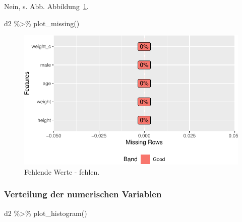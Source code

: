 \documentclass[
  a4paper,
  DIV=11]{scrreprt}
\newenvironment{Shaded}{\begin{snugshade}}{\end{snugshade}}
\newcommand{\FunctionTok}[1]{\textcolor[rgb]{0.28,0.35,0.67}{#1}}
\newcommand{\NormalTok}[1]{\textcolor[rgb]{0.00,0.23,0.31}{#1}}
\newcommand{\SpecialCharTok}[1]{\textcolor[rgb]{0.37,0.37,0.37}{#1}}
\theoremstyle{definition}
\theoremstyle{remark}
\begin{document}
Nein, s. Abb. Abbildung~\ref{fig-na}.

\begin{Shaded}
\begin{Highlighting}[]
\NormalTok{d2 }\SpecialCharTok{\%\textgreater{}\%} \FunctionTok{plot\_missing}\NormalTok{()}
\end{Highlighting}
\end{Shaded}

\begin{figure}[H]

{\centering \includegraphics{./lineare-modelle_files/figure-pdf/fig-na-1.pdf}

}

\caption{\label{fig-na}Fehlende Werte - fehlen.}

\end{figure}

\hypertarget{verteilung-der-numerischen-variablen}{%
\subsubsection{Verteilung der numerischen
Variablen}\label{verteilung-der-numerischen-variablen}}

\begin{Shaded}
\begin{Highlighting}[]
\NormalTok{d2 }\SpecialCharTok{\%\textgreater{}\%} \FunctionTok{plot\_histogram}\NormalTok{()}
\end{Highlighting}
\end{Shaded}
\end{document}
